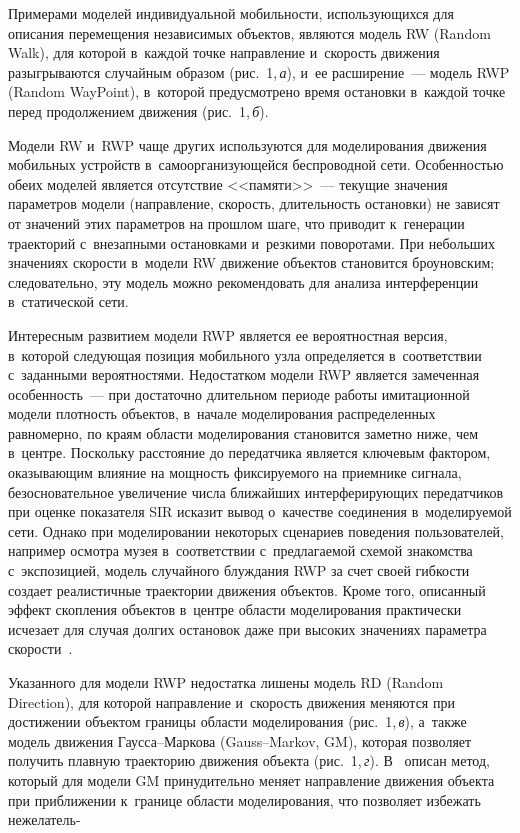 \begin{multicols}{2}
  Примерами моделей индивидуальной мобильности, использующихся для 
описания перемещения независимых объектов, являются модель RW 
(Random Walk), для которой в~каж\-дой точке на\-прав\-ле\-ние и~ско\-рость 
движения разыгрываются случайным образом (рис.~1,\,\textit{а}), и~ее 
расширение~--- модель RWP (Random WayPoint), в~которой пред\-усмот\-ре\-но 
время остановки в~каж\-дой точке перед продолжением движения 
(рис.~1,\,\textit{б}). 

Модели RW и~RWP чаще других используются для 
моделирования движения мобильных устройств в~самоорганизующейся 
беспроводной сети. Особенностью обеих моделей является отсутствие 
<<памяти>>~--- текущие значения па\-ра\-мет\-ров модели (на\-прав\-ле\-ние, 
ско\-рость, длительность остановки) не зависят от значений этих па\-ра\-мет\-ров 
на прошлом шаге, что приводит к~генерации траекторий с~внезапными 
остановками и~резкими поворотами. При небольших значениях ско\-рости 
в~модели RW движение объектов становится броуновским; следовательно, 
эту модель мож\-но рекомендовать для анализа интерференции в~статической 
сети. 

Интересным развитием модели RWP является ее вероятностная версия, 
в~которой следующая позиция мобильного узла определяется в~соответствии 
с~заданными вероятностями. Недостатком модели RWP является замеченная 
осо\-бен\-ность~--- при достаточно длительном периоде работы имитационной 
модели плот\-ность объектов, в~начале моделирования распределенных 
равномерно, по краям об\-ласти моделирования становится заметно ниже, чем 
в~цент\-ре. Поскольку рас\-сто\-яние до передатчика является клю\-че\-вым 
фактором, оказывающим вли\-яние на мощ\-ность фик\-си\-ру\-емо\-го на приемнике 
сигнала, безосновательное увеличение чис\-ла ближайших интерферирующих 
передатчиков при оценке\linebreak
 показателя SIR исказит вывод о~качестве 
со\-еди\-не\-ния в~мо\-де\-ли\-ру\-емой сети. Однако при моделировании некоторых 
сценариев поведения пользователей, например осмот\-ра музея в~соответствии\linebreak 
с~пред\-ла\-га\-емой схемой знакомства с~экспозицией, модель случайного 
блуж\-да\-ния RWP за счет своей гиб\-кости создает реалистичные траектории 
движения объектов. Кроме того, описанный эффект скопления объектов 
в~цент\-ре об\-ласти моделирования практически исчезает для случая дол\-гих 
остановок даже при высоких значениях па\-ра\-мет\-ра ско\-рости~\cite{10-sg}.


  Указанного для модели RWP недостатка лишены модель RD (Random 
Direction), для которой на\-прав\-ле\-ние и~ско\-рость движения меняются при 
достижении объектом границы об\-ласти моделирования (рис.~1,\,\textit{в}), 
а~так\-же модель движения Гаус\-са--Мар\-ко\-ва (Gauss--Markov, GM), 
которая позволяет получить плав\-ную траекторию движения объекта 
(рис.~1,\,\textit{г}). В~\cite{10-sg} описан метод, который для модели GM 
принудительно меняет на\-прав\-ле\-ние движения объекта при при\-бли\-же\-нии 
к~границе об\-ласти моделирования, что позволяет избежать нежелатель-\linebreak\vspace*{-12pt}


\end{multicols}
